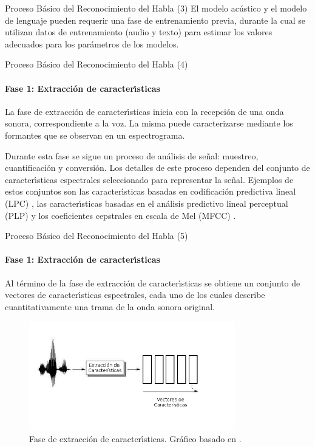 \begin{frame}{Proceso B\'asico del Reconocimiento del Habla (3)}
El modelo ac\'ustico y el modelo de lenguaje pueden requerir una fase de entrenamiento previa,
durante la cual se utilizan datos de entrenamiento (audio y texto) para estimar los valores adecuados 
para los par\'ametros de los modelos.
\end{frame}

\begin{frame}{Proceso B\'asico del Reconocimiento del Habla (4)}
\framesubtitle{Fase 1: Extracci\'on de caracter{\'\i}sticas}

La fase de extracci\'on de caracter{\'\i}sticas inicia con la recepci\'on de una onda sonora, correspondiente a la voz.
La misma puede caracterizarse mediante los formantes \cite{Fant1960acoustic} que se observan en un espectrograma.

Durante esta fase se sigue un proceso de an\'alisis de se\~nal: muestreo, cuantificaci\'on y conversi\'on.
Los detalles de este proceso dependen del conjunto de caracter{\'\i}sticas espectrales seleccionado 
para representar la se\~nal. Ejemplos de estos conjuntos son las caracter{\'\i}sticas basadas en codificaci\'on
predictiva lineal (LPC) \cite{KesarkarFeature2003}, las caracter{\'\i}sticas basadas en el an\'alisis predictivo
lineal perceptual (PLP) \cite{Ellis08anintroduction} y los coeficientes cepstrales en escala de 
Mel (MFCC) \cite{Jurafsky}.
\end{frame}

\begin{frame}{Proceso B\'asico del Reconocimiento del Habla (5)}
\framesubtitle{Fase 1: Extracci\'on de caracter{\'\i}sticas}
Al t\'ermino de la fase de extracci\'on de caracter{\'\i}sticas se obtiene un conjunto de vectores de
caracter{\'\i}sticas espectrales, cada uno de los cuales describe cuantitativamente una trama de la 
onda sonora original.

\begin{figure}[H] 
\centering
\includegraphics[width=0.8\textwidth]{./graphics/extraccion.png}
\caption{Fase de extracci\'on de caracter{\'\i}sticas. Gr\'afico basado en \cite{VerenichASR}.}
\label{figure:hmm}
\end{figure}
\end{frame}


